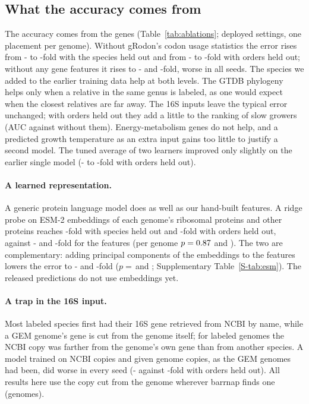 \subsection{What the accuracy comes from}


The accuracy comes from the genes (Table~\ref{tab:ablations}; deployed settings, one placement per genome). Without gRodon's
codon usage statistics the error rises from \AblFinalErrSpecies- to \AblGStatErrSpecies-fold with the species held out and
from \AblFinalErrOrder- to \AblGStatErrOrder-fold with orders held out; without any gene features it rises to
\AblGenesErrSpecies- and \AblGenesErrOrder-fold, worse in all \NSeedsAblation seeds. The species we added to the earlier
training data help at both levels. The GTDB phylogeny helps only when a relative in the same genus is labeled, as one would
expect when the closest relatives are far away. The 16S inputs leave the typical error unchanged; with orders held out they
add a little to the ranking of slow growers (AUC \AblFinalAucOrder against \AblSixteenAucOrder without them). Energy-metabolism genes do not help, and a predicted growth temperature as an extra input gains too
little to justify a second model. The tuned average of two learners improved only slightly on the earlier single model
(\TuneErrBefore- to \TuneErrAfter-fold with orders held out).

\paragraph{A learned representation.} A generic protein language model does as well as our hand-built features. A ridge
probe on ESM-2 embeddings \citep{lin2023} of each genome's ribosomal proteins and \EsmNOther other proteins reaches
\EsmProbeErrSameGenus-fold with species held out and \EsmProbeErrNewOrder-fold with orders held out, against
\EsmFeatErrSameGenus- and \EsmFeatErrNewOrder-fold for the features (per genome $p=0.87$ and
\EsmProbePNewOrder). The two are complementary: adding \EsmPCComb principal components of the embeddings to the features
lowers the error to \EsmCombErrSameGenus- and \EsmCombErrNewOrder-fold ($p=$\,\EsmCombPSameGenus and \EsmCombPNewOrder;
Supplementary Table~\ref{S-tab:esm}). The released predictions do not use embeddings yet.

\paragraph{A trap in the 16S input.} Most labeled species first had their 16S gene retrieved from NCBI by name, while a GEM
genome's gene is cut from the genome itself; for \SixteenFarther labeled genomes the NCBI copy was farther from the
genome's own gene than from another species. A model trained on NCBI copies and given genome copies, as the GEM genomes had
been, did worse in every seed (\SixteenErrMixedOrder- against \SixteenErrNcbiOrder-fold with orders held out). All results
here use the copy cut from the genome wherever barrnap finds one (\SixteenNGenomeCopy genomes).

